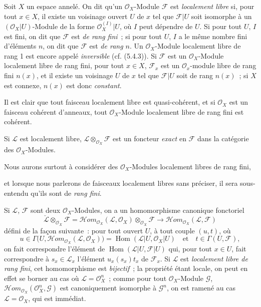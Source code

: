 \begin{env}[5.4.1]
\label{0.5.4.1-fr}
Soit $X$ un espace annelé. On dit qu'un $\mathcal{O}_X$-Module $\mathcal{F}$
est \emph{localement libre} si, pour tout $x\in X$, il existe un voisinage
ouvert $U$ de $x$ tel que $\mathcal{F}|U$ soit isomorphe à un
$(\mathcal{O}_X|U)$-Module de la forme $\mathcal{O}_X^{(I)}|U$, où $I$ peut
dépendre de $U$. Si pour tout $U$, $I$ est fini, on dit que $\mathcal{F}$ est
\emph{de rang fini}~; si pour tout $U$, $I$ a le même nombre fini d'éléments
$n$, on dit que $\mathcal{F}$ est \emph{de rang $n$}. Un
$\mathcal{O}_X$-Module localement libre de rang 1 est encore appelé
\emph{inversible} (cf. (5.4.3)). Si $\mathcal{F}$ est un
$\mathcal{O}_X$-Module localement libre de rang fini, pour tout $x\in X$,
$\mathcal{F}_x$ est un $\mathcal{O}_x$-module libre de rang fini $n(x)$, et il
existe un voisinage $U$ de $x$ tel que $\mathcal{F}|U$ soit de rang $n(x)$~;
si $X$ est connexe, $n(x)$ est donc \emph{constant}.

Il est clair que tout faisceau localement libre est quasi-cohérent, et si
$\mathcal{O}_X$ est un faisceau cohérent d'anneaux, tout
$\mathcal{O}_X$-Module localement libre de rang fini est cohérent.

Si $\mathcal{L}$ est localement libre,
$\mathcal{L}\otimes_{\mathcal{O}_X}\mathcal{F}$ est un foncteur \emph{exact}
en $\mathcal{F}$ dans la catégorie des $\mathcal{O}_X$-Modules.

Nous aurons surtout à considérer des $\mathcal{O}_X$-Modules localement libres
de rang fini,


et lorsque nous parlerons de faisceaux localement libres sans préciser, il
sera sous-entendu qu'ils sont de \emph{rang fini}.
\end{env}

\begin{env}[5.4.2]
\label{0.5.4.2-fr}
Si $\mathcal{L}$, $\mathcal{F}$ sont deux $\mathcal{O}_X$-Modules, on a un
homomorphisme canonique fonctoriel
\[
  \check{\mathcal{L}}\otimes_{\mathcal{O}_X}\mathcal{F}
  =\mathcal{H}\!om_{\mathcal{O}_X}(\mathcal{L},\mathcal{O}_X)
   \otimes_{\mathcal{O}_X}\mathcal{F}
  \longrightarrow
  \mathcal{H}\!om_{\mathcal{O}_X}(\mathcal{L},\mathcal{F})
  \tag{5.4.2.1}\label{0.5.4.2.1-fr}
\]
défini de la façon suivante~: pour tout ouvert $U$, à tout couple $(u,t)$, où
\[
  u\in\Gamma\bigl(U,
    \mathcal{H}\!om_{\mathcal{O}_X}(\mathcal{L},\mathcal{O}_X)\bigr)
  =\operatorname{Hom}(\mathcal{L}|U,\mathcal{O}_X|U)
  \quad\text{et}\quad
  t\in\Gamma(U,\mathcal{F}),
\]
on fait correspondre l'élément de
$\operatorname{Hom}(\mathcal{L}|U,\mathcal{F}|U)$ qui, pour tout $x\in U$,
fait correspondre à $s_x\in\mathcal{L}_x$ l'élément $u_x(s_x)t_x$ de
$\mathcal{F}_x$. Si $\mathcal{L}$ est \emph{localement libre de rang fini},
cet homomorphisme est \emph{bijectif}~; la propriété étant locale, on peut en
effet se borner au cas où $\mathcal{L}=\mathcal{O}_X^n$~; comme pour tout
$\mathcal{O}_X$-Module $\mathcal{G}$,
$\mathcal{H}\!om_{\mathcal{O}_X}(\mathcal{O}_X^n,\mathcal{G})$ est
canoniquement isomorphe à $\mathcal{G}^n$, on est ramené au cas
$\mathcal{L}=\mathcal{O}_X$, qui est immédiat.
\end{env}

